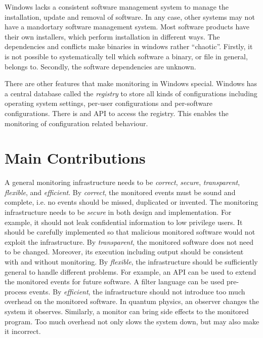 Windows lacks a consistent software management system to manage
the installation, update and removal of software.
In any case, other systems may not have a mandortary software management system.
Most software products have their own installers, which perform installation in
different ways.
The dependencies and conflicts make binaries in windows rather ``chaotic''.
Firstly, it is not possible to systematically tell which software a binary,
or file in general, belongs to.
Secondly, the software dependencies are unknown.

There are other features that make monitoring in Windows special.
Windows has a central database called the {\em registry} to store
all kinds of configurations including operating system settings,
per-user configurations and per-software configurations.
There is and API to access the registry.
This enables the monitoring of configuration related behaviour.

\section{Main Contributions}
\label{sec:contribution}

A general monitoring infrastructure needs to be
{\em correct}, {\em secure}, {\em transparent}, {\em flexible}, and {\em efficient}.
By {\em correct}, the monitored events must be sound and complete, i.e.
no events should be missed, duplicated or invented.
The monitoring infrastructure needs to be {\em secure} in both design and implementation.
For example, it should not leak confidential information to low privilege users.
It should be carefully implemented so that malicious monitored
software would not exploit the infrastructure.
By {\em transparent}, the monitored software does not need to be changed.
Moreover, its execution including output should be consistent with and without
monitoring.
By {\em flexible}, the infrastructure should be sufficiently general to
handle different problems.
For example, an API can be used to extend the monitored events for future software.
A filter language can be used pre-process events.
By {\em efficient}, the infrastructure should not introduce too much
overhead on the monitored software.
In quantum physics, an observer changes the system it observes.
Similarly, a monitor can bring side effects to the monitored program.
Too much overhead not only slows the system down, but may also make
it incorrect.


